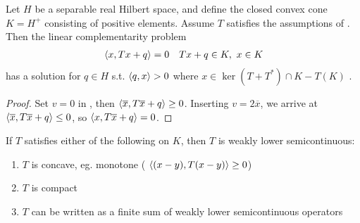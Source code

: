 \begin{comment}
In addition, by positivity of $T$, we can write up the inequality
\begin{align*}
	\ip{x_0}{Tx_n + q} - \ip{x_n}{q} \geq 0
\end{align*}
So $\ip{x_0}{Tx_n+q} \geq \ip{x_n}{q}$, taking limits gives $\ip{x_0}{Tx^*+q} \geq \ip{x^*}{q}$
Which is a contradiction to the previous inequality. Therefore the sequence $u_n$ must be uniformly bounded, and we can without loss of generality assume that $u_n$ is weakly convergent to $u^*$, else we could pass to a subsequence.
Going back to the finite-dimensional case, we have the sequence of inequalities for any $x \in K$
\begin{equation}
	\ip{x - u_n}{q+Tu_n} \geq 0
\end{equation}
Splitting up, we arrive at
\begin{align*}
	\ip{x-u_n}{q}+\ip{x}{Tu_n}-\ip{u_n}{Tu_n} \geq 0
	\limsup_{n}(\ip{x-u_n}{q}+\ip{x}{Tu_n}) \geq \limsup_{n}\ip{u_n}{Tu_n} \geq 0
	\lim_{n} \ip{x-u_n}{q} + \lim_{n} \ip{x}{Tu_n} \geq \limsup_{n} \ip{u_n}{T u_n} \geq \ip{u^*}{Tu^*}
	\ip{x-u^*}{q} + \ip{x}{Tu_n^*} \geq \ip{u^*}{Tu^*}
\end{align*}
showing that $\ip{x-u^*}{q}+\ip{x}{Tu^*}-\ip{u_n}{Tu^*} \geq 0$, thus there exists a solution to the problem. The solution set is bounded by an analogous argument to the boundedness of $u_n$,, and clearly closed, hence weakly compact.
\end{proof}
\end{comment}
\begin{corollary}
  \label{cor:lcp_formulation}
  Let $H$ be a separable real Hilbert space, and define the closed convex cone $K=H^+$ consisting of positive elements. Assume $T$ satisfies the assumptions of . Then the linear complementarity problem
  \begin{align*}
    &\left \langle x,Tx+q \right \rangle = 0
    &Tx+q \in K, ~x \in K
  \end{align*}
  has a solution for $q \in H$ s.t. $\left \langle q,x \right \rangle > 0$ where $x\in \ker(T+T^*) \cap K - T(K)$ .
\end{corollary}
\begin{proof}
  Set $v=0$ in , then $\left \langle \overline{x},T\overline{x} + q \right \rangle \geq 0$. Inserting $v=2\overline{x}$, we arrive at
  $\left \langle \overline{x},T\overline{x}+q \right \rangle\leq 0$, so $\left \langle x,T\overline{x}+q \right \rangle = 0$.
\end{proof}
\begin{lemma}
	If $T$ satisfies either of the following on $K$, then $T$ is weakly lower semicontinuous:
	\begin{enumerate}
		\item $T$ is concave, eg. monotone ( $\left \langle (x-y),T(x-y) \right \rangle\geq 0$) %
		\item $T$ is compact
		\item $T$ can be written as a finite sum of weakly lower semicontinuous operators
	\end{enumerate}
\end{lemma}
